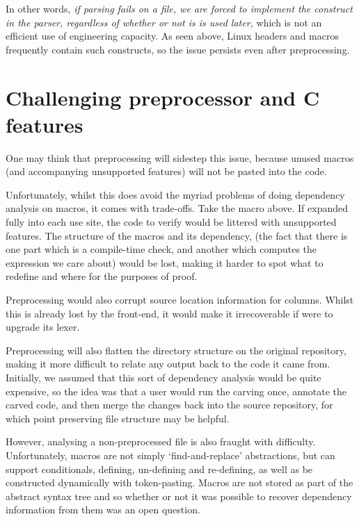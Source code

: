 In other words, \emph{if parsing fails on a file, we are forced to implement
the construct in the parser, regardless of whether or not is is used later,}
which is not an efficient use of engineering capacity. As seen above, Linux
headers and macros frequently contain such constructs, so the issue persists
even after preprocessing.

\section{Challenging preprocessor and C features}

One may think that preprocessing will sidestep this issue, because unused
macros (and accompanying unsupported features) will not be pasted into the
code.

Unfortunately, whilst this does avoid the myriad problems of doing dependency
analysis on macros, it comes with trade-offs. Take the  macro
above. If expanded fully into each use site, the code to verify would be
littered with unsupported features. The structure of the macros and its
dependency, (the fact that there is one part which is a compile-time check, and
another which computes the expression we care about) would be lost, making it
harder to spot what to redefine and where for the purposes of proof.

Preprocessing would also corrupt source location information for
columns. Whilst this is already lost
by the  front-end, it would make it irrecoverable if 
were to upgrade its
lexer.

Preprocessing will also flatten the directory structure on the original
repository, making it more difficult to relate any output back to the code it
came from. Initially, we assumed that this sort of dependency analysis would be
quite expensive, so the idea was that a user would run the carving once,
annotate the carved code, and then merge the changes back into the source
repository, for which point preserving file structure may be
helpful.

However, analysing a non-preprocessed file is also fraught with difficulty.
Unfortunately, macros are not simply `find-and-replace' abstractions, but can
support conditionals, defining, un-defining and re-defining, as well as be
constructed dynamically with token-pasting. Macros are not stored as part of
the abstract syntax tree and so whether or not it was possible to recover
dependency information from them was an open question.

